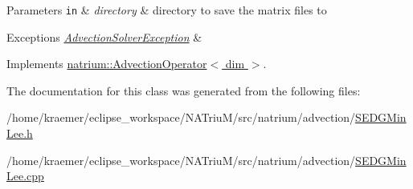 \begin{DoxyParams}[1]{Parameters}
\mbox{\tt in}  & {\em directory} & directory to save the matrix files to \\
\hline
\end{DoxyParams}

\begin{DoxyExceptions}{Exceptions}
{\em \hyperlink{classnatrium_1_1AdvectionSolverException}{Advection\-Solver\-Exception}} & \\
\hline
\end{DoxyExceptions}


Implements \hyperlink{classnatrium_1_1AdvectionOperator_aca14260bae100874b0050a2a96d7a564}{natrium\-::\-Advection\-Operator$<$ dim $>$}.



The documentation for this class was generated from the following files\-:\begin{DoxyCompactItemize}
\item 
/home/kraemer/eclipse\-\_\-workspace/\-N\-A\-Triu\-M/src/natrium/advection/\hyperlink{SEDGMinLee_8h}{S\-E\-D\-G\-Min\-Lee.\-h}\item 
/home/kraemer/eclipse\-\_\-workspace/\-N\-A\-Triu\-M/src/natrium/advection/\hyperlink{SEDGMinLee_8cpp}{S\-E\-D\-G\-Min\-Lee.\-cpp}\end{DoxyCompactItemize}
